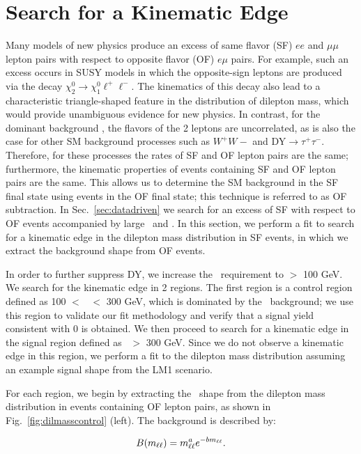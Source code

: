 \section{Search for a Kinematic Edge}
\label{sec:fit}

Many models of new physics produce an excess of same flavor (SF) $ee$ and $\mu\mu$ lepton pairs
with respect to opposite flavor (OF) $e\mu$ pairs. For example, such an excess occurs in SUSY models
in which the opposite-sign leptons are produced via the decay $\chi_2^0 \to \chi_1^0 \ell^+\ell^-$.
The kinematics of this decay also lead to a characteristic triangle-shaped feature in the distribution
of dilepton mass, which would provide unambiguous evidence for new physics.
In contrast, for the dominant background \ttbar, the flavors of the 2 leptons are uncorrelated,
as is also the case for other SM background processes such as $W^+W-$ and DY$\to\tau^+\tau^-$.
Therefore, for these processes the rates of SF and OF lepton pairs are the same; 
furthermore, the kinematic properties of events containing SF and OF lepton pairs are the same. 
This allows us to determine the SM background in the SF final state using events in the OF
final state; this technique is referred to as OF subtraction. In Sec.~\ref{sec:datadriven}
we search for an excess of SF with respect to OF events accompanied by large \MET\ and \Ht. 
In this section, we perform a fit to search for a kinematic edge in the dilepton mass distribution 
in SF events, in which we extract the background shape from OF events.

In order to further suppress DY, we increase the \MET\ requirement to \MET $>$ 100 GeV. 
We search for the kinematic edge in 2 regions.  The first region is a control region defined
as 100 $<$ \Ht\ $<$ 300 GeV, which is dominated by the \ttbar\ background; we use 
this region to validate our fit methodology and verify that a signal yield consistent with 0 
is obtained. We then proceed to search for a kinematic edge in the signal region defined as 
\Ht\ $>$ 300 GeV. Since we do not observe a kinematic edge in this region, we perform a 
fit to the dilepton mass distribution assuming an example signal shape from the LM1 scenario.

For each region, we begin by extracting the \ttbar\ shape from the dilepton mass distribution 
in events containing OF lepton pairs, as shown in Fig.~\ref{fig:dilmasscontrol} (left). 
The background is described by:

\begin{equation}
B(m_{\ell\ell}) = m_{\ell\ell}^a e^{-b m_{\ell\ell}}.
\end{equation}

